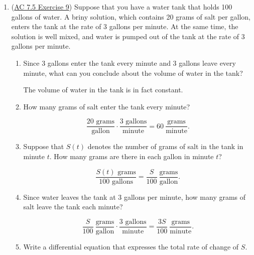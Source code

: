 \begin{enumerate}[leftmargin=0pt]
\begin{enumerate}
    \begin{red}
        So, I mean, probably not, for several reasons: 
        \begin{itemize}
            \item This function $W(t)$ is always increasing and has no horizontal asymptote; the model thus predicts that the person will keep growing forever.
            \item This model predicts a pretty low weight for someone who's 20 years old: $W(240) \approx 64.3$ pounds. That's a very small adult! I think this model doesn't know about various ``growth spurts'' that humans go through.
        \end{itemize}
    \end{red}

\end{enumerate}


\item (\href{https://faculty.gvsu.edu/boelkinm/Home/ACS/sec-7-5-modeling.html#jmX}{AC 7.5 Exercise 9}) Suppose that you have a water tank that holds 100 gallons of water. A briny solution, which contains 20 grams of salt per gallon, enters the tank at the rate of 3 gallons per minute. At the same time, the solution is well mixed, and water is pumped out of the tank at the rate of 3 gallons per minute.
\begin{enumerate}
    \item Since 3 gallons enter the tank every minute and 3 gallons leave every minute, what can you conclude about the volume of water in the tank?

    \begin{red}
        The volume of water in the tank is in fact constant.
    \end{red}
    \item How many grams of salt enter the tank every minute?
    \begin{red}
        \[\dfrac{20\text{ grams}}{\text{gallon}}\cdot \dfrac{3\text{ gallons}}{\text{minute}} = 60\ \dfrac{\text{grams}}{\text{minute}}.\]
    \end{red}
    \item Suppose that $S(t)$ denotes the number of grams of salt in the tank in minute $t$. How many grams are there in each gallon in minute $t$?
    \begin{red}
        \[\dfrac{S(t)\text{ grams}}{100\text{ gallons}} = \dfrac{S}{100}\ \dfrac{\text{grams}}{\text{gallon}}.\]
    \end{red}
    \item Since water leaves the tank at 3 gallons per minute, how many grams of salt leave the tank each minute?
    \begin{red}
        \[\dfrac{S}{100}\ \dfrac{\text{grams}}{\text{gallon}}\cdot  \dfrac{3\text{ gallons}}{\text{minute}} =\dfrac{3S}{100}\ \dfrac{\text{grams}}{\text{minute}}. \]
    \end{red}
    \item Write a differential equation that expresses the total rate of change of $S$.


\end{enumerate}
\end{enumerate}
